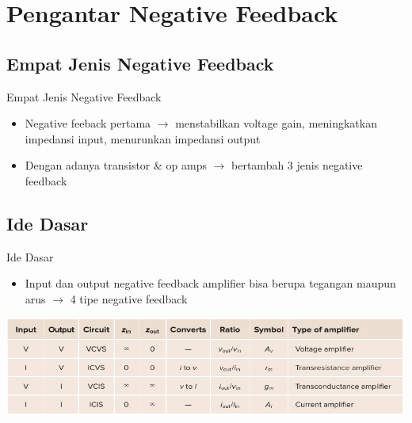 \section{Pengantar Negative Feedback}

\subsection{Empat Jenis Negative Feedback}	
\begin{frame}{Empat Jenis Negative Feedback}	
	\begin{itemize}
		\item Negative feeback pertama $ \rightarrow $ menstabilkan voltage gain, meningkatkan impedansi input, menurunkan impedansi output
		\item Dengan adanya transistor \& op amps $\rightarrow$ bertambah 3 jenis negative feedback
	\end{itemize}
\end{frame}

\subsection{Ide Dasar}
\begin{frame}{Ide Dasar}
	\begin{itemize}
		\item Input dan output negative feedback amplifier bisa berupa tegangan maupun arus $ \rightarrow $ 4 tipe negative feedback
	\end{itemize}
	\begin{center}
		\includegraphics[width=\linewidth]{gambar/table-17.01}
	\end{center}
\end{frame}

